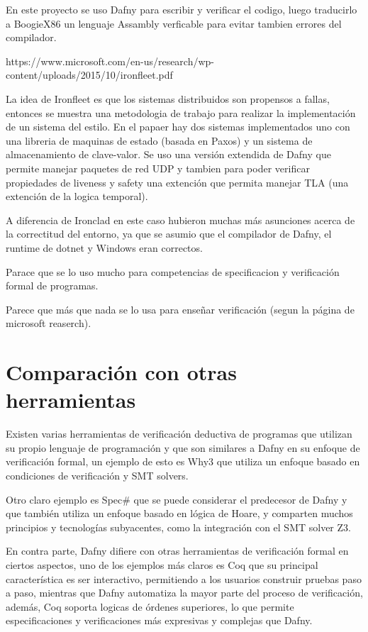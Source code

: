 \documentclass[runningheads]{llncs}
\begin{document}
En este proyecto se uso Dafny para escribir y verificar el codigo, luego traducirlo a BoogieX86 un lenguaje Assambly verficable para evitar tambien errores del compilador.

https://www.microsoft.com/en-us/research/wp-content/uploads/2015/10/ironfleet.pdf

La idea de Ironfleet es que los sistemas distribuidos son propensos a fallas, entonces se muestra una metodologia de trabajo para realizar la implementación de un sistema del estilo. En el papaer hay dos sistemas implementados uno con una libreria de maquinas de estado (basada en Paxos) y un sistema de almacenamiento de clave-valor.
Se uso una versión extendida de Dafny que permite manejar paquetes de red UDP y tambien para poder verificar propiedades de liveness y safety una extención que permita manejar TLA (una extención de la logica temporal).

A diferencia de Ironclad en este caso hubieron muchas más asunciones acerca de la correctitud del entorno, ya que se asumio que el compilador de Dafny, el runtime de dotnet y Windows eran correctos.


Parace que se lo uso mucho para competencias de specificacion y verificación formal de programas.

Parece que más que nada se lo usa para enseñar verificación (segun la página de microsoft reaserch).

\section{Comparación con otras herramientas}

Existen varias herramientas de verificación deductiva de programas que utilizan su propio lenguaje de programación 
y que son similares a Dafny en su enfoque de verificación formal, 
un ejemplo de esto es Why3 que utiliza un enfoque basado en condiciones de verificación y SMT solvers.

Otro claro ejemplo es Spec\# que se puede considerar el predecesor de Dafny y que también utiliza un enfoque basado en lógica de Hoare,
y comparten muchos principios y tecnologías subyacentes, como la integración con el SMT solver Z3.

En contra parte, Dafny difiere con otras herramientas de verificación formal en ciertos aspectos, uno de los ejemplos más claros es Coq 
que su principal característica es ser interactivo, 
permitiendo a los usuarios construir pruebas paso a paso, mientras que Dafny automatiza la mayor parte del proceso de verificación,
además, Coq soporta logicas de órdenes superiores, lo que permite especificaciones y verificaciones más expresivas y complejas que Dafny.
\end{document}
